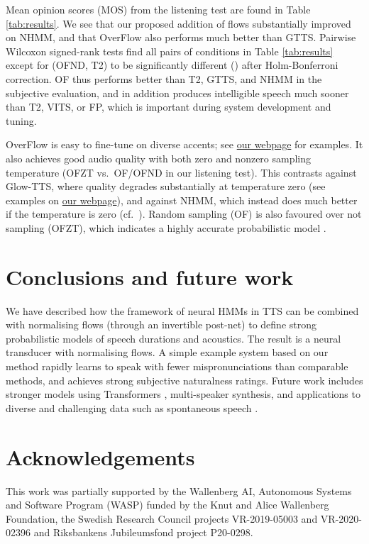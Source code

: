 \documentclass[british]{INTERSPEECH2023_arxiv}
\newcommand{\webpageurl}{https://shivammehta25.github.io/OverFlow/}
\begin{document}
Mean opinion scores (MOS) from the listening test are found in Table \ref{tab:results}.
We see that our proposed addition of flows substantially improved on NHMM, and that OverFlow also performs much better than GTTS.
Pairwise Wilcoxon signed-rank tests find
all pairs of conditions in Table \ref{tab:results} except for (OFND, T2) to be
significantly different () after Holm-Bonferroni \cite{holm1979simple} correction.
OF thus performs better than T2, GTTS, and NHMM in the subjective evaluation, and in addition produces intelligible speech much sooner than T2, VITS, or FP, which is important during system development and tuning.


OverFlow is easy to fine-tune on diverse accents; see \href{\webpageurl}{our webpage} for examples.
It also achieves
good audio quality with both zero and nonzero sampling temperature
(OFZT vs.\ OF/OFND in our listening test).
This contrasts against Glow-TTS, where quality degrades substantially at temperature zero (see examples on \href{\webpageurl}{our webpage}), and against NHMM, which instead does much better if the temperature is zero (cf.\ \cite{mehta2022neural}).
Random sampling (OF) is also favoured over not sampling (OFZT), which indicates a highly accurate probabilistic model \cite{henter2014measuring}.




\section{Conclusions and future work}
\label{sec:conclusion}
We have described how the framework of neural HMMs in TTS can be combined with normalising flows (through an invertible post-net) to define strong probabilistic models of speech durations and acoustics.
The result is a neural transducer with normalising flows.
A simple example system based on our method rapidly learns to speak with fewer mispronunciations than comparable methods, and achieves strong subjective naturalness ratings.
Future work includes stronger models using Transformers \cite{vaswani2017attention,li2019neural},
multi-speaker synthesis, and applications to diverse and challenging data such as spontaneous speech \cite{szekely2019spontaneous,lameris2023prosody}.


\ifinterspeechfinal
\section{Acknowledgements}
\label{sec:acks}
This work was partially supported by the Wallenberg AI, Autonomous Systems and Software Program (WASP) funded by the Knut and Alice Wallenberg Foundation, the Swedish Research Council projects
VR-2019-05003
and
VR-2020-02396
and Riksbankens Jubileumsfond project P20-0298.
\else
\fi



\end{document}
